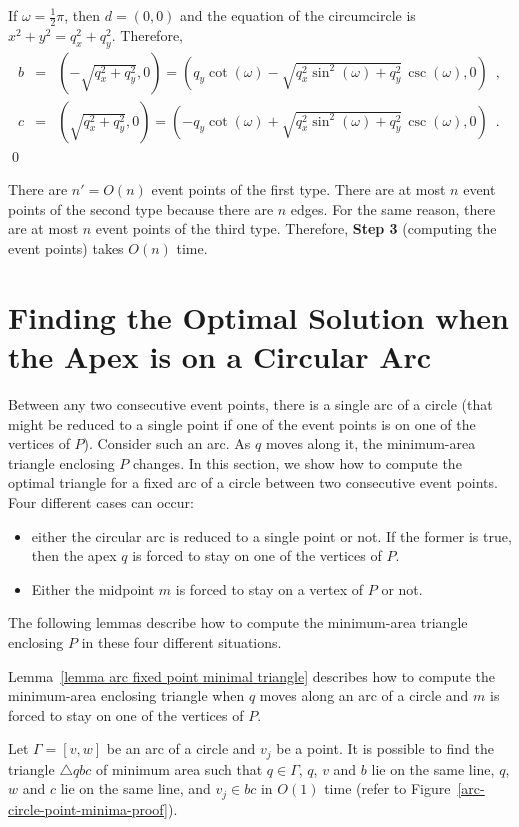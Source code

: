 \documentclass[11pt, oneside]{article}
\begin{document}
If $\omega=\frac{1}{2}\pi$,
then $d=(0,0)$ and the equation of the circumcircle is $x^2+y^2 = q_x^2+q_y^2$.
Therefore,
\begin{eqnarray*}
b &=& \left(-\sqrt{q_x^2+q_y^2},0\right) = \left(q_y\cot(\omega)-\sqrt{q_x^2\sin^2\!(\omega)+q_y^2}\,\csc(\omega),0\right) \enspace,\\
c &=& \left(\sqrt{q_x^2+q_y^2},0\right) = \left(-q_y\cot(\omega)+\sqrt{q_x^2\sin^2\!(\omega)+q_y^2}\,\csc(\omega),0\right) \enspace.
\end{eqnarray*}
\qed

There are $n'=O(n)$ event points of the first type.
There are at most $n$ event points of the second type
because there are $n$ edges.
For the same reason,
there are at most $n$ event points of the third type.
Therefore,
{\bf Step 3} 
(computing the event points)
takes $O(n)$ time.




\section{Finding the Optimal Solution when the Apex is on a Circular Arc}
\label{section optimal solution apex on circular arc}




Between any two consecutive event points,
there is a single arc of a circle
(that might be reduced to a single point
if one of the event points is on one of the vertices of $P$).
Consider such an arc.
As $q$ moves along it,
the minimum-area triangle enclosing $P$ changes.
In this section,
we show how to compute the optimal triangle
for a fixed arc of a circle
between two consecutive event points.
Four different cases can occur:
\begin{itemize}
\item either the circular arc is reduced to a single point or not.
If the former is true,
then the apex $q$ is forced to stay on one of the vertices of $P$.

\item Either the midpoint $m$ is forced to stay on a vertex of $P$ or not.
\end{itemize}
The following lemmas describe how to compute 
the minimum-area triangle enclosing $P$
in these four different situations.

Lemma~\ref{lemma arc fixed point minimal triangle}
describes how to compute the minimum-area enclosing triangle
when $q$ moves along an arc of a circle
and $m$ is forced to stay on one of the vertices of $P$.
\begin{lemma}
\label{lemma arc fixed point minimal triangle}
Let $\Gamma = [v,w]$ be an arc of a circle
and $v_j$ be a point.
It is possible to find the triangle $\triangle qbc$
of minimum area such that $q \in \Gamma$,
$q$, $v$ and $b$ lie on the same line,
$q$, $w$ and $c$ lie on the same line,
and $v_j \in bc$
in $O(1)$ time
(refer to Figure~\ref{arc-circle-point-minima-proof}).
\end{lemma}
\end{document}
